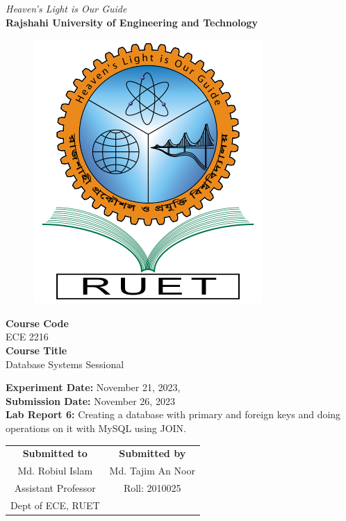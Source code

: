 \vspace*{\fill}
\begin{center}

    \emph{Heaven's Light is Our Guide} \\
    \textbf{Rajshahi University of Engineering and Technology} \\

    \begin{figure}[h]
        \centering
        \includegraphics[scale=.34]{images/RUET_logo.png}
        \label{fig:ruet_logo}
    \end{figure}
    \vspace{5mm}

    \textbf{Course Code}\\
    ECE 2216\\
    \vspace{3mm}
    \textbf{Course Title}\\
    Database Systems Sessional

    \vspace{5mm}
    \textbf{Experiment Date:} November 21, 2023,\\
    \textbf{Submission Date:} November 26, 2023\\

    \vspace{5mm}
    \textbf{Lab Report 6:} Creating a database with primary and foreign keys and doing operations on it with MySQL using JOIN.\\

    \vspace{15mm}

    \begin{tabular}{c|c}
        \textbf{Submitted to} & \textbf{Submitted by} \\
        Md. Robiul Islam      & Md. Tajim An Noor     \\
        Assistant Professor   & Roll: 2010025         \\
        Dept of ECE, RUET     &                       \\
    \end{tabular}

\end{center}
\vspace*{\fill}
